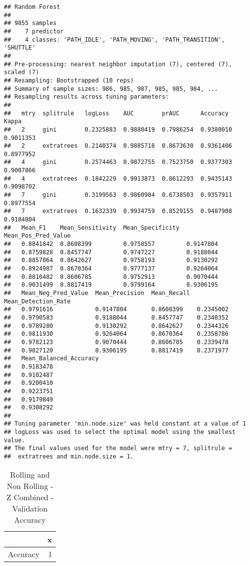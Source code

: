 \documentclass[]{article}
\begin{document}
\begin{verbatim}
## Random Forest 
## 
## 9855 samples
##    7 predictor
##    4 classes: 'PATH_IDLE', 'PATH_MOVING', 'PATH_TRANSITION', 'SHUTTLE' 
## 
## Pre-processing: nearest neighbor imputation (7), centered (7), scaled (7) 
## Resampling: Bootstrapped (10 reps) 
## Summary of sample sizes: 986, 985, 987, 985, 985, 984, ... 
## Resampling results across tuning parameters:
## 
##   mtry  splitrule   logLoss    AUC        prAUC      Accuracy   Kappa    
##   2     gini        0.2325883  0.9880419  0.7986254  0.9380010  0.9011353
##   2     extratrees  0.2140374  0.9885718  0.8673630  0.9361406  0.8977952
##   4     gini        0.2574463  0.9872755  0.7523750  0.9377303  0.9007866
##   4     extratrees  0.1842229  0.9913873  0.8612293  0.9435143  0.9098702
##   7     gini        0.3199563  0.9860904  0.6738503  0.9357911  0.8977554
##   7     extratrees  0.1632339  0.9934759  0.8529155  0.9487908  0.9184804
##   Mean_F1    Mean_Sensitivity  Mean_Specificity  Mean_Pos_Pred_Value
##   0.8841842  0.8608399         0.9758557         0.9147804          
##   0.8759828  0.8457747         0.9747227         0.9188044          
##   0.8857064  0.8642627         0.9758193         0.9130292          
##   0.8924987  0.8670364         0.9777137         0.9264064          
##   0.8810482  0.8606785         0.9752913         0.9070444          
##   0.9031499  0.8817419         0.9799164         0.9306195          
##   Mean_Neg_Pred_Value  Mean_Precision  Mean_Recall  Mean_Detection_Rate
##   0.9791616            0.9147804       0.8608399    0.2345002          
##   0.9790583            0.9188044       0.8457747    0.2340352          
##   0.9789280            0.9130292       0.8642627    0.2344326          
##   0.9811930            0.9264064       0.8670364    0.2358786          
##   0.9782123            0.9070444       0.8606785    0.2339478          
##   0.9827120            0.9306195       0.8817419    0.2371977          
##   Mean_Balanced_Accuracy
##   0.9183478             
##   0.9102487             
##   0.9200410             
##   0.9223751             
##   0.9179849             
##   0.9308292             
## 
## Tuning parameter 'min.node.size' was held constant at a value of 1
## logLoss was used to select the optimal model using the smallest value.
## The final values used for the model were mtry = 7, splitrule =
##  extratrees and min.node.size = 1.
\end{verbatim}

\begin{table}[!h]

\caption{\label{tab:sensor-z-combined-rolling-rf-results}Rolling and Non Rolling - Z Combined - Validation Accuracy}
\centering
\begin{tabular}[t]{lr}
\toprule
  & x\\
\midrule
Accuracy & 1\\
\bottomrule
\end{tabular}
\end{table}
\end{document}
